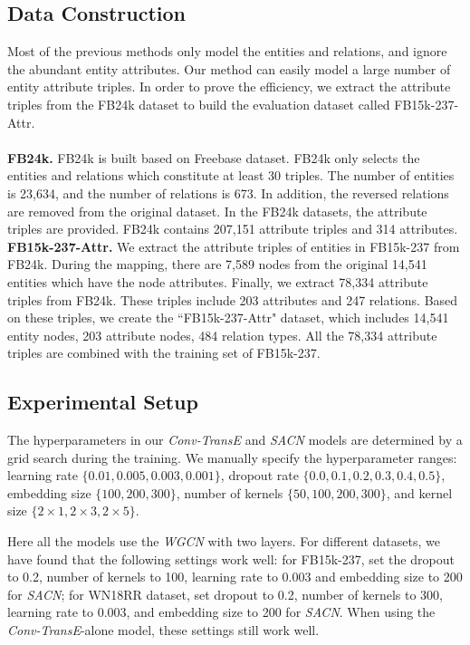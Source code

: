 \documentclass[letterpaper]{article} \usepackage{aaai19}  \usepackage{times}  \usepackage{helvet}  \usepackage{courier}  \usepackage{url}  \usepackage{graphicx}  \usepackage{amsmath}
\begin{document}
\subsection{Data Construction}
Most of the previous methods only model the entities and relations, and ignore the abundant entity attributes. Our method can easily model a large number of entity attribute triples. In order to prove the efficiency, we extract the attribute triples from the FB24k \cite{lin2016knowledge} dataset to build the evaluation dataset called FB15k-237-Attr.\\
\\
\textbf{FB24k.} 
FB24k \cite{lin2016knowledge} is built based on Freebase dataset. FB24k only selects the entities and relations which constitute at least 30 triples. The number of entities is 23,634, and the number of relations is 673. In addition, the reversed relations are removed from the original dataset. In the FB24k datasets, the attribute triples are provided. FB24k contains 207,151 attribute triples and 314 attributes. \\
\textbf{FB15k-237-Attr.} 
We extract the attribute triples of entities in FB15k-237 from FB24k. During the mapping, there are 7,589 nodes from the original 14,541 entities which have the node attributes. Finally, we extract 78,334 attribute triples from FB24k. These triples include 203 attributes and 247 relations. 
Based on these triples, we create the ``FB15k-237-Attr" dataset, which includes 14,541 entity nodes, 203 attribute nodes, 484 relation types. All the 78,334 attribute triples are combined with the training set of FB15k-237.

\subsection{Experimental Setup}

The hyperparameters in our {\it Conv-TransE} and {\it SACN} models are determined by a grid search during the training. We manually specify the hyperparameter ranges: learning rate $\{0.01,0.005,0.003,0.001\}$, dropout rate $\{0.0,0.1,0.2,0.3,0.4,0.5\}$, embedding size $\{100, 200, 300\}$, number of kernels $\{50, 100, 200, 300\}$, and kernel size $\{2\times1, 2\times3, 2\times5\}$.

Here all the models use the {\it WGCN} with two layers.
For different datasets, we have found that the following  settings work well: for FB15k-237, set the dropout to 0.2, number of kernels to 100, learning rate to 0.003 and embedding size to 200 for {\it SACN};
for WN18RR dataset, set dropout to 0.2, number of kernels to 300, learning rate to 0.003, and embedding size to 200 for {\it SACN}. 
When using the {\it Conv-TransE}-alone model, these settings still work well.
\end{document}
